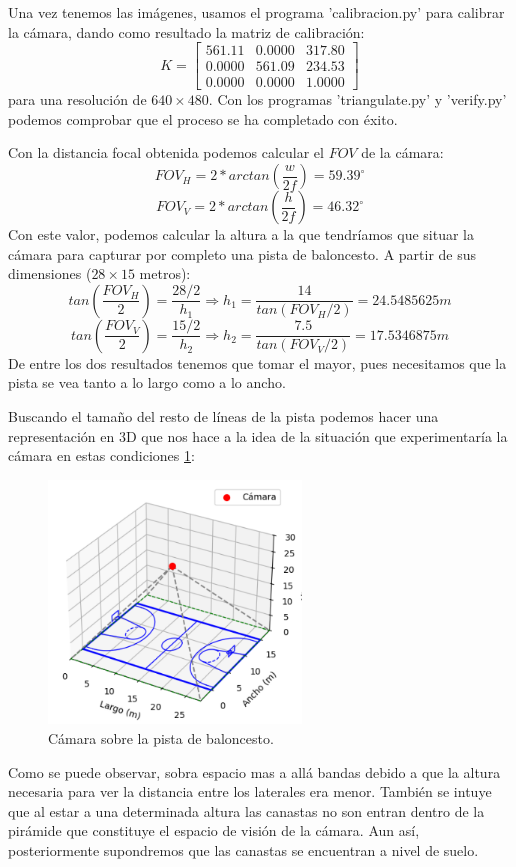 \documentclass[12pt]{article}
\begin{document}
Una vez tenemos las imágenes, usamos el programa 'calibracion.py' para calibrar la cámara, dando como resultado la matriz de calibración:
$$
K=
\begin{bmatrix}
    561.11 & 0.0000 & 317.80 \\
    0.0000 & 561.09 & 234.53 \\
    0.0000 & 0.0000 & 1.0000
\end{bmatrix}
$$
para una resolución de $640 \times 480$. Con los programas 'triangulate.py' y 'verify.py' podemos comprobar que el proceso se ha completado con éxito.

Con la distancia focal obtenida podemos calcular el $FOV$ de la cámara:
$$FOV_H = 2*arctan \left( \frac{w}{2f} \right) = 59.39^{\circ}$$ 
$$FOV_V = 2*arctan \left( \frac{h}{2f} \right) = 46.32^{\circ}$$
Con este valor, podemos calcular la altura a la que tendríamos que situar la cámara para capturar por completo una pista de baloncesto.
A partir de sus dimensiones ($28 \times 15$ metros):
$$
tan(\frac{FOV_H}{2}) = \frac{28/2}{h_1} \Rightarrow h_1 = \frac{14}{tan(FOV_H/2)}=24.5485625m
$$
$$
tan(\frac{FOV_V}{2}) = \frac{15/2}{h_2} \Rightarrow h_2 = \frac{7.5}{tan(FOV_V/2)}=17.5346875m
$$
De entre los dos resultados tenemos que tomar el mayor, pues necesitamos que la pista se vea tanto a lo largo como a lo ancho.

Buscando el tamaño del resto de líneas de la pista podemos hacer una representación en 3D que nos hace a la idea de la situación que experimentaría la cámara en estas condiciones \ref{fig:pista_basket}:
\begin{figure}[H]
    \centering
    \includegraphics[width=0.6\textwidth]{images_calibracion/Pista_basket.png}  %
    \caption{Cámara sobre la pista de baloncesto.}
    \label{fig:pista_basket}
\end{figure}
Como se puede observar, sobra espacio mas a allá bandas debido a que la altura necesaria para ver la distancia entre los laterales era menor. 
También se intuye que al estar a una determinada altura las canastas no son entran dentro de la pirámide que constituye el espacio de visión de la cámara.
Aun así, posteriormente supondremos que las canastas se encuentran a nivel de suelo.
\end{document}

